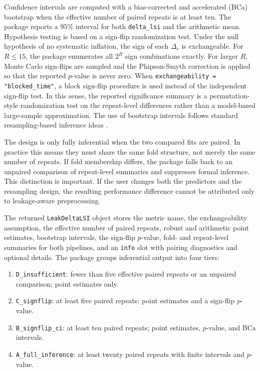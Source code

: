 \documentclass[article]{jss}
\begin{document}
Confidence intervals are computed with a bias-corrected and accelerated (BCa)
bootstrap when the effective number of paired repeats is at least ten. The
package reports a $95\%$ interval for both \texttt{delta\_lsi} and the
arithmetic mean. Hypothesis testing is based on a sign-flip randomization test.
Under the null hypothesis of no systematic inflation, the sign of each
$\Delta_r$ is exchangeable. For $R \leq 15$, the package enumerates all
$2^R$ sign combinations exactly. For larger $R$, Monte Carlo sign-flips are
sampled and the Phipson-Smyth correction is applied so that the reported
$p$-value is never zero. When \texttt{exchangeability = "blocked\_time"}, a
block sign-flip procedure is used instead of the independent sign-flip test.
In this sense, the reported significance summary is a permutation-style
randomization test on the repeat-level differences rather than a model-based
large-sample approximation. The use of bootstrap intervals follows standard
resampling-based inference ideas \citep{efron1979, efron1993}.

The design is only fully inferential when the two compared fits are paired. In
practice this means they must share the same fold structure, not merely the
same number of repeats. If fold membership differs, the package falls back to an
unpaired comparison of repeat-level summaries and suppresses formal inference.
This distinction is important. If the user changes both the predictors and the
resampling design, the resulting performance difference cannot be attributed
only to leakage-aware preprocessing.

The returned \texttt{LeakDeltaLSI} object stores the metric name, the
exchangeability assumption, the effective number of paired repeats, robust and
arithmetic point estimates, bootstrap intervals, the sign-flip $p$-value, fold-
and repeat-level summaries for both pipelines, and an \texttt{info} slot with
pairing diagnostics and optional details. The package groups inferential output
into four tiers:
\begin{enumerate}
\item \texttt{D\_insufficient}: fewer than five effective paired repeats or an
unpaired comparison; point estimates only.
\item \texttt{C\_signflip}: at least five paired repeats; point estimates and a
sign-flip $p$-value.
\item \texttt{B\_signflip\_ci}: at least ten paired repeats; point estimates,
$p$-value, and BCa intervals.
\item \texttt{A\_full\_inference}: at least twenty paired repeats with finite
intervals and $p$-value.
\end{enumerate}
\end{document}
